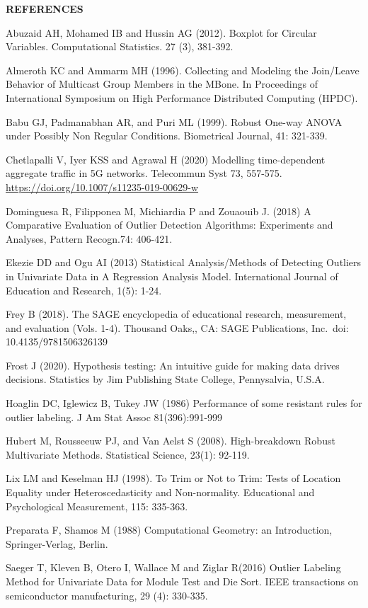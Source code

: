 \documentclass[
]{article}
\begin{document}
\textbf{REFERENCES}

Abuzaid AH, Mohamed IB and Hussin AG (2012). Boxplot for Circular
Variables. Computational Statistics. 27 (3), 381-392.

Almeroth KC and Ammarm MH (1996). Collecting and Modeling the Join/Leave
Behavior of Multicast Group Members in the MBone. In Proceedings of
International Symposium on High Performance Distributed Computing
(HPDC).

Babu GJ, Padmanabhan AR, and Puri ML (1999). Robust One-way ANOVA under
Possibly Non Regular Conditions. Biometrical Journal, 41: 321-339.

Chetlapalli V, Iyer KSS and Agrawal H (2020) Modelling time-dependent
aggregate traffic in 5G networks. Telecommun Syst 73, 557-575.
\url{https://doi.org/10.1007/s11235-019-00629-w}

Dominguesa R, Filipponea M, Michiardia P and Zouaouib J. (2018) A
Comparative Evaluation of Outlier Detection Algorithms: Experiments and
Analyses, Pattern Recogn.74: 406-421.

Ekezie DD and Ogu AI (2013) Statistical Analysis/Methods of Detecting
Outliers in Univariate Data in A Regression Analysis Model.
International Journal of Education and Research, 1(5): 1-24.

Frey B (2018). The SAGE encyclopedia of educational research,
measurement, and evaluation (Vols. 1-4). Thousand Oaks,, CA: SAGE
Publications, Inc.~doi: 10.4135/9781506326139

Frost J (2020). Hypothesis testing: An intuitive guide for making data
drives decisions. Statistics by Jim Publishing State College,
Pennysalvia, U.S.A.

Hoaglin DC, Iglewicz B, Tukey JW (1986) Performance of some resistant
rules for outlier labeling. J Am Stat Assoc 81(396):991-999

Hubert M, Rousseeuw PJ, and Van Aelst S (2008). High-breakdown Robust
Multivariate Methods. Statistical Science, 23(1): 92-119.

Lix LM and Keselman HJ (1998). To Trim or Not to Trim: Tests of Location
Equality under Heteroscedasticity and Non-normality. Educational and
Psychological Measurement, 115: 335-363.

Preparata F, Shamos M (1988) Computational Geometry: an Introduction,
Springer-Verlag, Berlin.

Saeger T, Kleven B, Otero I, Wallace M and Ziglar R(2016) Outlier
Labeling Method for Univariate Data for Module Test and Die Sort. IEEE
transactions on semiconductor manufacturing, 29 (4): 330-335.
\end{document}
